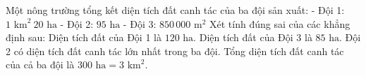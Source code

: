 \begin{ex} %
Một nông trường tổng kết diện tích đất canh tác của ba đội sản xuất:
- Đội 1: $1\text{ km}^2\ 20\text{ ha}$
- Đội 2: $95\text{ ha}$
- Đội 3: $850\,000\text{ m}^2$
Xét tính đúng sai của các khẳng định sau:
\choiceTF
{\True Diện tích đất của Đội 1 là $120\text{ ha}$.}
{\True Diện tích đất của Đội 3 là $85\text{ ha}$.}
{Đội 2 có diện tích đất canh tác lớn nhất trong ba đội.}
{\True Tổng diện tích đất canh tác của cả ba đội là $300\text{ ha} = 3\text{ km}^2$.}
\end{ex}

